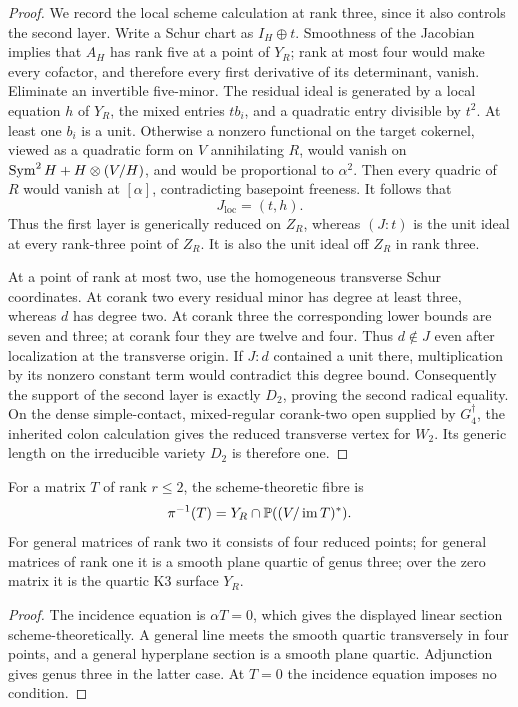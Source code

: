 \begin{proof}
We record the local scheme calculation at rank three, since it also
controls the second layer.  Write a Schur chart as \(I_H\oplus t\).
Smoothness of the Jacobian implies that \(A_H\) has rank five at a
point of \(Y_R\); rank at most four would make every cofactor, and
therefore every first derivative of its determinant, vanish.  Eliminate
an invertible five-minor.  The residual ideal is generated by a local
equation \(h\) of \(Y_R\), the mixed entries \(t b_i\), and a
quadratic entry divisible by \(t^2\).  At least one \(b_i\) is a
unit.  Otherwise a nonzero functional on the target cokernel,
viewed as a quadratic form on \(V\) annihilating \(R\), would
vanish on \(\operatorname{Sym}^2H+H\otimes(V/H)\), and would be proportional to
\(\alpha^2\).  Then every quadric of \(R\) would vanish at
\([\alpha]\), contradicting basepoint freeness.  It follows that
\[
 J_{\mathrm{loc}}=(t,h).
\]
Thus the first layer is generically reduced on \(Z_R\), whereas
\((J:t)\) is the unit ideal at every rank-three point of \(Z_R\).
It is also the unit ideal off \(Z_R\) in rank three.

At a point of rank at most two, use the homogeneous transverse Schur
coordinates.  At corank two every residual minor has degree at least
three, whereas \(d\) has degree two.  At corank three the corresponding
lower bounds are seven and three; at corank four they are twelve and
four.  Thus \(d\notin J\) even after localization at the transverse
origin.  If \(J:d\) contained a unit there, multiplication by its
nonzero constant term would contradict this degree bound.  Consequently
the support of the second layer is exactly \(D_2\), proving the
second radical equality.  On the dense simple-contact, mixed-regular
corank-two open supplied by \(G_4^\dagger\), the inherited colon
calculation gives the reduced transverse vertex for \(W_2\).
Its generic length on the irreducible variety \(D_2\) is therefore
one.
\end{proof}

\begin{corollary}
\label{cor:resolution-fibres}
For a matrix \(T\) of rank \(r\le2\), the scheme-theoretic fibre is
\[
 \pi^{-1}(T)=Y_R\cap\mathbb P((V/\operatorname{im}T)^*).
\]
For general matrices of rank two it consists of four reduced points;
for general matrices of rank one it is a smooth plane quartic of
genus three; over the zero matrix it is the quartic K3 surface \(Y_R\).
\end{corollary}
\begin{proof}
The incidence equation is \(\alpha T=0\), which gives the displayed
linear section scheme-theoretically.  A general line meets the smooth
quartic transversely in four points, and a general hyperplane section
is a smooth plane quartic.  Adjunction gives genus three in the latter
case.  At \(T=0\) the incidence equation imposes no condition.
\end{proof}

